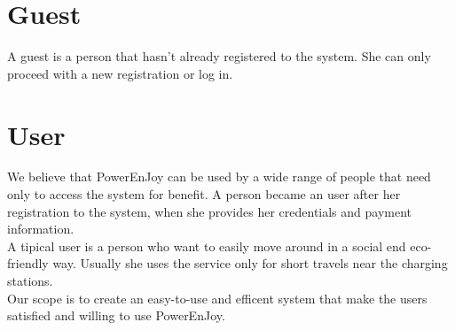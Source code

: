 \section{Guest}
A guest is a person that hasn't already registered to the system. She can only proceed with a new registration or log in.
\section{User}
We believe that PowerEnJoy can be used by a wide range of people that need only to access the system for benefit. A person became an user after her registration to the system, when she provides her credentials and payment information. 
\\A tipical user is a person who want to easily move around in a social end eco-friendly way. Usually she uses the service only for short travels near the \glspl{charging station}.
\\Our scope is to create an easy-to-use and efficent system that make the users satisfied and willing to use PowerEnJoy.

